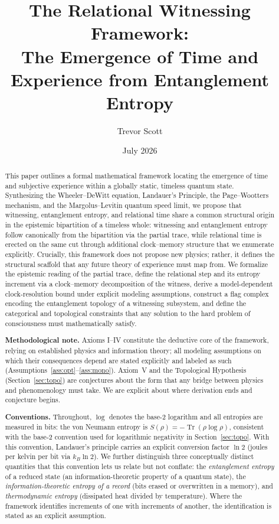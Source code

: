 \documentclass[11pt, a4paper]{article}
\title{\textbf{The Relational Witnessing Framework:} \\
The Emergence of Time and Experience from Entanglement Entropy}
\author{Trevor Scott}
\date{July 2026}
\begin{document}
\maketitle

\begin{abstract}
This paper outlines a formal mathematical framework locating the emergence of time and subjective experience within a globally static, timeless quantum state. Synthesizing the Wheeler--DeWitt equation, Landauer's Principle, the Page--Wootters mechanism, and the Margolus--Levitin quantum speed limit, we propose that witnessing, entanglement entropy, and relational time share a common structural origin in the epistemic bipartition of a timeless whole: witnessing and entanglement entropy follow canonically from the bipartition via the partial trace, while relational time is erected on the same cut through additional clock--memory structure that we enumerate explicitly. Crucially, this framework does not propose new physics; rather, it defines the structural scaffold that any future theory of experience must map from. We formalize the epistemic reading of the partial trace, define the relational step and its entropy increment via a clock--memory decomposition of the witness, derive a model-dependent clock-resolution bound under explicit modeling assumptions, construct a flag complex encoding the entanglement topology of a witnessing subsystem, and define the categorical and topological constraints that any solution to the hard problem of consciousness must mathematically satisfy.

\medskip
\noindent\textbf{Methodological note.} Axioms I--IV constitute the deductive core of the framework, relying on established physics and information theory; all modeling assumptions on which their consequences depend are stated explicitly and labeled as such (Assumptions~\ref{ass:opt}--\ref{ass:mono}). Axiom~V and the Topological Hypothesis (Section~\ref{sec:topo}) are conjectures about the form that any bridge between physics and phenomenology must take. We are explicit about where derivation ends and conjecture begins.

\medskip
\noindent\textbf{Conventions.} Throughout, $\log$ denotes the base-2 logarithm and all entropies are measured in bits: the von Neumann entropy is $S(\rho) = -\operatorname{Tr}(\rho \log \rho)$, consistent with the base-2 convention used for logarithmic negativity in Section~\ref{sec:topo}. With this convention, Landauer's principle carries an explicit conversion factor $\ln 2$ (joules per kelvin per bit via $k_B \ln 2$). We further distinguish three conceptually distinct quantities that this convention lets us relate but not conflate: the \emph{entanglement entropy} of a reduced state (an information-theoretic property of a quantum state), the \emph{information-theoretic entropy of a record} (bits erased or overwritten in a memory), and \emph{thermodynamic entropy} (dissipated heat divided by temperature). Where the framework identifies increments of one with increments of another, the identification is stated as an explicit assumption.
\end{abstract}
\end{document}
